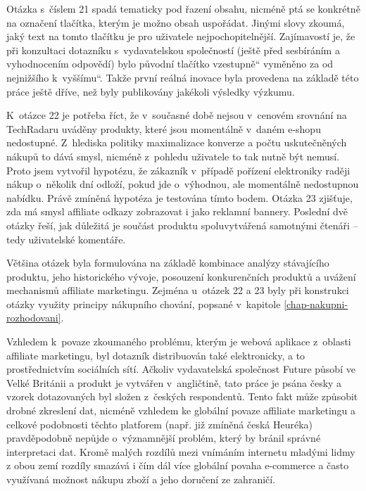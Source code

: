 \documentclass[12pt,twoside,openany]{fithesis}
\begin{document}
Otázka s~číslem 21 spadá tematicky pod řazení obsahu, nicméně ptá se 
konkrétně na označení tlačítka, kterým je možno obsah uspořádat. 
Jinými slovy zkoumá, jaký text na tomto tlačítku je pro uživatele 
nejpochopitelnější. Zajímavostí je, že při konzultaci dotazníku 
s~vydavatelskou společností (ještě před sesbíráním a vyhodnocením 
odpovědí) bylo původní tlačítko \glqq vzestupně\textquotedblleft{} 
vyměněno za \glqq od nejnižšího k~vyššímu\textquotedblleft{}. Takže 
první reálná inovace byla provedena na základě této práce ještě 
dříve, než byly publikovány jakékoli výsledky výzkumu.

K~otázce 22 je potřeba říct, že v~současné době nejsou v~cenovém 
srovnání na TechRadaru uváděny produkty, které jsou momentálně v~daném 
e-shopu nedostupné. Z~hlediska politiky maximalizace konverze a počtu 
uskutečněných nákupů to dává smysl, nicméně z~pohledu uživatele to 
tak nutně být nemusí. Proto jsem vytvořil hypotézu, že zákazník 
v~případě pořízení elektroniky raději nákup o~několik dní odloží, 
pokud jde o~výhodnou, ale momentálně nedostupnou nabídku. Právě 
zmíněná hypotéza je testována tímto bodem. Otázka 23 zjišťuje, zda má 
smysl affiliate odkazy zobrazovat i jako reklamní bannery. Poslední dvě 
otázky řeší, jak důležitá je součást produktu spoluvytvářená 
samotnými čtenáři -- tedy uživatelské komentáře.

Většina otázek byla formulována na základě kombinace analýzy 
stávajícího produktu, jeho historického vývoje, posouzení konkurenčních 
produktů a uvážení mechanismů affiliate marketingu. Zejména u~otázek 22 
a 23 byly při konstrukci otázky využity principy nákupního chování, 
popsané v~kapitole 
\hyperlink{chap-nakupni-rozhodovani}{{\ref{chap-nakupni-rozhodovani}}}.

Vzhledem k~povaze zkoumaného problému, kterým je webová aplikace z~oblasti 
affiliate marketingu, byl dotazník distribuován také elektronicky, a to 
prostřednictvím sociálních sítí. Ačkoliv vydavatelská společnost 
Future působí ve Velké Británii a produkt je vytvářen v~angličtině, 
tato práce je psána česky a vzorek dotazovaných byl složen z~českých 
respondentů. Tento fakt může způsobit drobné zkreslení dat, nicméně 
vzhledem ke globální povaze affiliate marketingu a celkové podobnosti 
těchto platforem (např. již zmíněná česká Heuréka) pravděpodobně 
nepůjde o~významnější problém, který by bránil správné interpretaci 
dat. Kromě malých rozdílů mezi vnímáním internetu mladými lidmy z obou
zemí rozdíly smazává i čím dál více globální povaha e-commerce a 
často využívaná možnost nákupu zboží a jeho doručení ze zahraničí.
\end{document}
